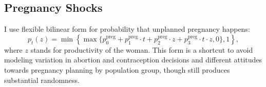 \subsection{Pregnancy Shocks}
I use flexible bilinear form for probability that unplanned pregnancy happens:
\[p_t(z) = \min \left\{ \max\{ p^{\text{preg}}_0 +  p^{\text{preg}}_{1} \cdot t + p^{\text{preg}}_{2} \cdot z + p^{\text{preg}}_{3} \cdot t\cdot z, 0\}, 1\right\},\]
where $z$ stands for productivity of the woman. This form is a shortcut to avoid modeling variation in abortion and contraception decisions and different attitudes towards pregnancy planning by population group, though still produces substantial randomness.
